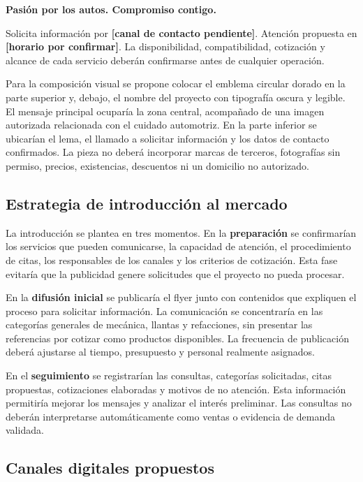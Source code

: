 \documentclass[12pt,letterpaper,oneside]{article}
\begin{document}
\textbf{Pasión por los autos. Compromiso contigo.}

Solicita información por \textbf{[canal de contacto pendiente]}. Atención propuesta en \textbf{[horario por confirmar]}. La disponibilidad, compatibilidad, cotización y alcance de cada servicio deberán confirmarse antes de cualquier operación.

Para la composición visual se propone colocar el emblema circular dorado en la parte superior y, debajo, el nombre del proyecto con tipografía oscura y legible. El mensaje principal ocuparía la zona central, acompañado de una imagen autorizada relacionada con el cuidado automotriz. En la parte inferior se ubicarían el lema, el llamado a solicitar información y los datos de contacto confirmados. La pieza no deberá incorporar marcas de terceros, fotografías sin permiso, precios, existencias, descuentos ni un domicilio no autorizado.

\subsection{Estrategia de introducción al mercado}

La introducción se plantea en tres momentos. En la \textbf{preparación} se confirmarían los servicios que pueden comunicarse, la capacidad de atención, el procedimiento de citas, los responsables de los canales y los criterios de cotización. Esta fase evitaría que la publicidad genere solicitudes que el proyecto no pueda procesar.

En la \textbf{difusión inicial} se publicaría el flyer junto con contenidos que expliquen el proceso para solicitar información. La comunicación se concentraría en las categorías generales de mecánica, llantas y refacciones, sin presentar las referencias por cotizar como productos disponibles. La frecuencia de publicación deberá ajustarse al tiempo, presupuesto y personal realmente asignados.

En el \textbf{seguimiento} se registrarían las consultas, categorías solicitadas, citas propuestas, cotizaciones elaboradas y motivos de no atención. Esta información permitiría mejorar los mensajes y analizar el interés preliminar. Las consultas no deberán interpretarse automáticamente como ventas o evidencia de demanda validada.

\subsection{Canales digitales propuestos}
\end{document}
